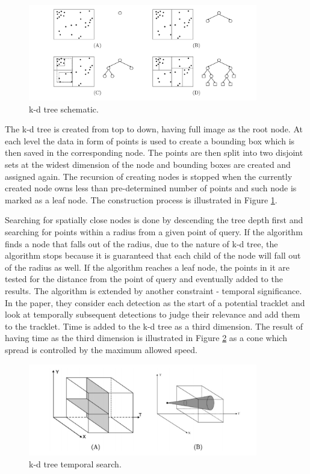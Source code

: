 	\begin{figure}[H]
	\centering
	  \includegraphics[width=10cm]{images/kd_tree}
		  \caption{k-d tree schematic.}
	  \label{fig:kd_tree}
	\end{figure}
	
	The k-d tree is created from top to down, having full image as the root node. At each level the data in form of points is used to create a bounding box which is then saved in the corresponding node. The points are then split into two disjoint sets at the widest dimension of the node and bounding boxes are created and assigned again. The recursion of creating nodes is stopped when the currently created node owns less than pre-determined number of points and such node is marked as a leaf node. The construction process is illustrated in Figure \ref{fig:kd_tree}.
	
	Searching for spatially close nodes is done by descending the tree depth first and searching for points within a radius from a given point of query. If the algorithm finds a node that falls out of the radius, due to the nature of k-d tree, the algorithm stops because it is guaranteed that each child of the node will fall out of the radius as well. If the algorithm reaches a leaf node, the points in it are tested for the distance from the point of query and eventually added to the results. The algorithm is extended by another constraint - temporal significance. In the paper, they consider each detection as the start of a potential tracklet and look at temporally subsequent detections to judge their relevance and add them to the tracklet. Time is added to the k-d tree as a third dimension. The result of having time as the third dimension is illustrated in Figure \ref{fig:kd_tree_time} as a cone which spread is controlled by the maximum allowed speed.
	
	\begin{figure}[H]
	\centering
	  \includegraphics[width=10cm]{images/kd_tree_time}
		  \caption{k-d tree temporal search.}
	  \label{fig:kd_tree_time}
	\end{figure}
	
